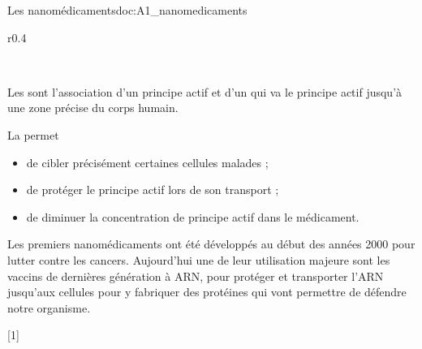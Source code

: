 \begin{doc}{Les nanomédicaments}{doc:A1_nanomedicaments}
  \begin{wrapfigure}[6]{r}{0.4\linewidth}
    \vspace*{-20pt}
    \begin{center}
       \\
    \end{center}
  \end{wrapfigure}

  Les  sont l'association d'un principe actif et d'un  qui va  le principe actif jusqu'à une zone précise du corps humain.

  \begin{importants}
    La  permet
    \begin{itemize}[label=\pointCyan, leftmargin=*]
      \item de cibler précisément certaines cellules malades ;
      \item de protéger le principe actif lors de son transport ;
      \item de diminuer la concentration de principe actif dans le médicament.
    \end{itemize}
  \end{importants}

  Les premiers nanomédicaments ont été développés au début des années 2000 pour lutter contre les cancers.
  Aujourd'hui une de leur utilisation majeure sont les vaccins de dernières génération à ARN, pour protéger et transporter l'ARN jusqu'aux cellules pour y fabriquer des protéines qui vont permettre de défendre notre organisme.
\end{doc}

[1]